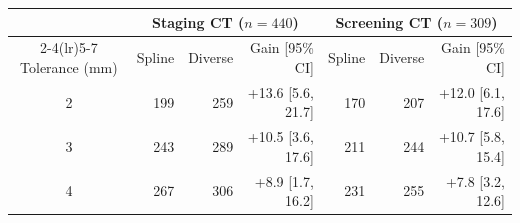 \begin{tabular}{crrrrrr}
\toprule
 & \multicolumn{3}{c}{Staging CT ($n=440$)} & \multicolumn{3}{c}{Screening CT ($n=309$)} \\
\cmidrule(lr){2-4}\cmidrule(lr){5-7}
Tolerance (mm) & Spline & Diverse & Gain [95\% CI] & Spline & Diverse & Gain [95\% CI] \\
\midrule
2 & 199 & 259 & +13.6 [5.6, 21.7] & 170 & 207 & +12.0 [6.1, 17.6] \\
3 & 243 & 289 & +10.5 [3.6, 17.6] & 211 & 244 & +10.7 [5.8, 15.4] \\
4 & 267 & 306 & +8.9 [1.7, 16.2] & 231 & 255 & +7.8 [3.2, 12.6] \\
\bottomrule
\end{tabular}
